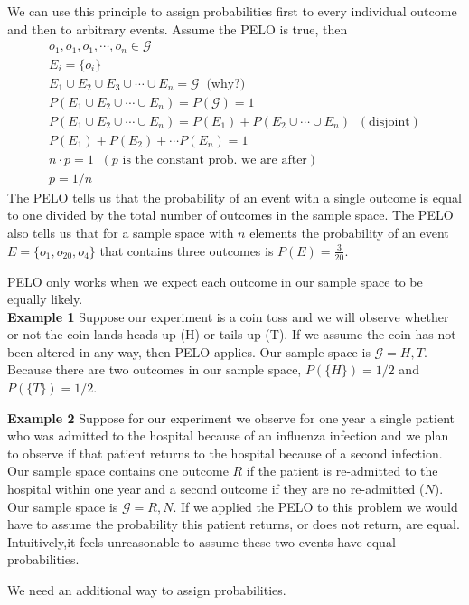We can use this principle to assign probabilities first to every individual outcome and then to arbitrary events. Assume the PELO is true, then 
\begin{align}
    o_{1},o_{1},o_{1}, \cdots,o_{n} \in \mathcal{G}\\
    E_{i} = \{o_{i}\}\\
    E_{1} \cup E_{2} \cup E_{3} \cup \cdots \cup E_{n} = \mathcal{G} \;\; \text{(why?)}\\ 
    P(E_{1} \cup E_{2} \cup \cdots \cup E_{n}) = P(\mathcal{G}) = 1 \\ 
    P(E_{1} \cup E_{2} \cup \cdots \cup E_{n}) = P(E_{1}) + P(E_{2} \cup \cdots \cup E_{n}) \;\; (\text{disjoint})\\
    P(E_{1}) + P(E_{2}) + \cdots P(E_{n}) = 1\\
    n \cdot p = 1 \;\; (p \text{ is the constant prob. we are after})\\
    p = 1/n
\end{align}
The PELO tells us that the probability of an event with a single outcome is equal to one divided by the total number of outcomes in the sample space.
The PELO also tells us that for a sample space with $n$ elements the probability of an event $E = \{o_{1},o_{20},o_{4}\}$ that contains three outcomes is $P(E) = \frac{3}{20}$.


\begin{VT1}


PELO only works when we expect each outcome in our sample space to be equally likely.\\ 

\textbf{Example 1} Suppose our experiment is a coin toss and we will observe whether or not the coin lands heads up (H) or tails up (T). If we assume the coin has not been altered in any way, then PELO applies.
Our sample space is $\mathcal{G} = {H,T}$. 
Because there are two outcomes in our sample space, $P(\{H\}) = 1/2$ and $P(\{T\}) = 1/2$.

\textbf{Example 2} Suppose for our experiment we observe for one year a single patient who was admitted to the hospital because of an influenza infection and we plan to observe if that patient returns to the hospital because of a second infection. Our sample space contains one outcome $R$ if the patient is re-admitted to the hospital within one year and a second outcome if they are no re-admitted ($N$).
Our sample space is $\mathcal{G} = {R,N}$. 
If we applied the PELO to this problem we would have to assume the probability this patient returns, or does not return, are equal. Intuitively,it feels unreasonable to assume these two events have equal probabilities.

We need an additional way to assign probabilities.
\end{VT1}

